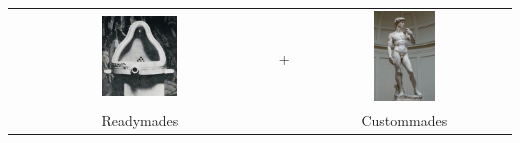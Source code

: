 \documentclass[aspectratio=169]{beamer}
\begin{document}
\begin{frame}

\begin{center}
\begin{tabular}{ccc}
\includegraphics[width=0.30\textwidth]{figures/duchamp_fountain} & \phantom{12} \LARGE{+} \phantom{12} & \includegraphics[width=0.30\textwidth]{figures/michelangelo_david} \\
\LARGE{Readymades} &  & \LARGE{Custommades}
\end{tabular}
\end{center}

\vfill
\vspace{0.2in}
\\

\end{frame}
\end{document}
